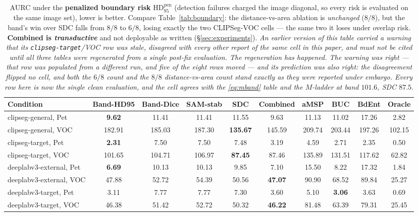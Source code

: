 \documentclass[11pt]{article}
\theoremstyle{remark}
\newcommand{\HDF}{\mathrm{HD}_{95}}
\begin{document}
\begin{table}[t]
\centering
\small
\caption{AURC under the \textbf{penalized boundary risk} $\HDF^{\mathrm{pen}}$
(detection failures charged the image diagonal, so every risk is evaluated on the
same image set), lower is better. Compare Table~\ref{tab:boundary}: the
distance-vs-area ablation is \emph{unchanged} ($8/8$), but the band's win over SDC
falls from $8/8$ to $6/8$, losing exactly the two CLIPSeg-VOC cells --- the same two
it loses under overlap risk. \textbf{Combined is \emph{transductive}} and not deployable
as written (\S\ref{sec:experiments}).
\emph{An earlier version of this table carried a warning that its
\texttt{clipseg-target}/VOC row was stale, disagreed with every other report of the
same cell in this paper, and must not be cited until all three tables were
regenerated from a single post-fix evaluation. The regeneration has happened. The
warning was right --- that row was populated from a different run, and five of the
eight rows moved --- and its prediction was also right: the disagreement flipped no
cell, and both the $6/8$ count and the $8/8$ distance-vs-area count stand exactly as
they were reported under embargo. Every row here is now the single clean evaluation,
and the cell agrees with the \eqref{eq:mband} table and the $M$-ladder at band
$101.6$, SDC $87.5$.}}
\label{tab:penalized}
\begin{tabular}{lccccccccc}
\toprule
Condition & Band-HD95 & Band-Dice & SAM-stab & SDC & Combined & aMSP & BUC & BdEnt & Oracle \\
\midrule
clipseg-general, Pet     & \textbf{9.62} & 11.41 & 11.41 & 11.55 & 9.63 & 11.13 & 11.02 & 17.26 & 2.82 \\
clipseg-general, VOC     & 182.91 & 185.03 & 187.30 & \textbf{135.67} & 145.59 & 209.74 & 203.44 & 197.26 & 102.15 \\
clipseg-target, Pet      & \textbf{2.31} & 7.50 & 7.50 & 7.48 & 3.19 & 4.59 & 2.71 & 2.35 & 0.50 \\
clipseg-target, VOC      & 101.65 & 104.71 & 106.97 & \textbf{87.45} & 87.46 & 135.89 & 131.51 & 117.62 & 62.82 \\
deeplabv3-external, Pet  & \textbf{6.69} & 10.13 & 10.13 & 9.85 & 7.10 & 15.50 & 8.22 & 17.32 & 1.84 \\
deeplabv3-external, VOC  & 47.88 & 52.72 & 54.39 & 50.56 & \textbf{47.07} & 90.90 & 68.52 & 89.84 & 25.27 \\
deeplabv3-target, Pet    & 3.11 & 7.77 & 7.77 & 7.30 & 3.60 & 5.10 & \textbf{3.06} & 3.63 & 0.69 \\
deeplabv3-target, VOC    & 46.38 & 51.42 & 52.72 & 50.32 & \textbf{46.22} & 81.48 & 63.39 & 79.31 & 25.45 \\
\bottomrule
\end{tabular}
\end{table}
\end{document}
